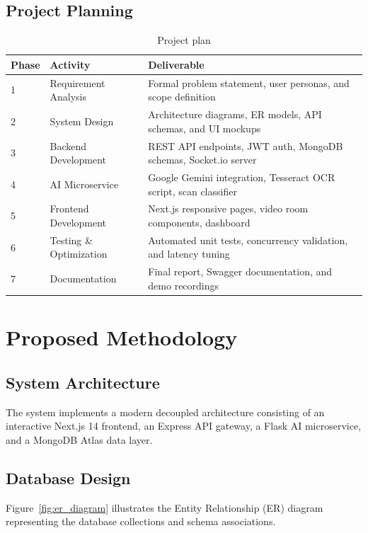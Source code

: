 \documentclass[12pt,a4paper]{report}
\begin{document}
\section{Project Planning}
\begin{table}[htbp]
\centering
\caption{Project plan}
\label{tab:project_plan}
\begin{tabularx}{\textwidth}{p{1.5cm} p{4.5cm} X}
\toprule
\textbf{Phase} & \textbf{Activity} & \textbf{Deliverable} \\
\midrule
1 & Requirement Analysis & Formal problem statement, user personas, and scope definition \\
2 & System Design & Architecture diagrams, ER models, API schemas, and UI mockups \\
3 & Backend Development & REST API endpoints, JWT auth, MongoDB schemas, Socket.io server \\
4 & AI Microservice & Google Gemini integration, Tesseract OCR script, scan classifier \\
5 & Frontend Development & Next.js responsive pages, video room components, dashboard \\
6 & Testing \& Optimization & Automated unit tests, concurrency validation, and latency tuning \\
7 & Documentation & Final report, Swagger documentation, and demo recordings \\
\bottomrule
\end{tabularx}
\end{table}

\chapter{Proposed Methodology}

\section{System Architecture}
The system implements a modern decoupled architecture consisting of an interactive Next.js 14 frontend, an Express API gateway, a Flask AI microservice, and a MongoDB Atlas data layer.

\section{Database Design}
Figure~\ref{fig:er_diagram} illustrates the Entity Relationship (ER) diagram representing the database collections and schema associations.
\end{document}
